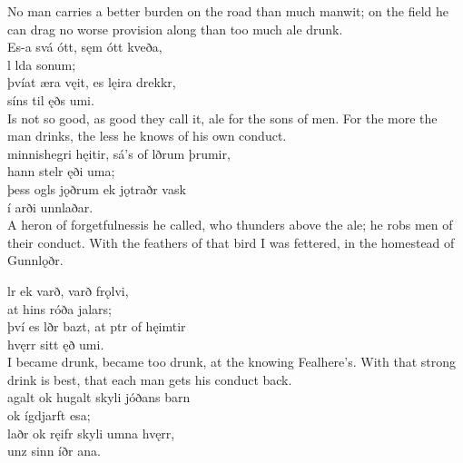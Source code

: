 \bvb No man carries a better burden on the road than much manwit; on the field he can drag no worse provision along than too much ale drunk. \\

\bva Es-a svá ótt, \hld sęm ótt kveða, \\%
\ind {}l lda sonum; \\%
þvíat æra vęit, \hld es lęira drekkr, \\%
\ind síns til ęðs umi.\\%

\bvb Is not so good, as good they call it, ale for the sons of men. For the more the man drinks, the less he knows of his own conduct. \\

\bva {}minnishegri hęitir, \hld sá's of lðrum þrumir, \\%
\ind hann stelr ęði uma; \\%
þess ogls jǫðrum \hld ek jǫtraðr vask \\%
\ind í arði unnlaðar.\\%

\bvb A heron of forgetfulness\footnotemark[13] is he called, who thunders above the ale; he robs men of their conduct. With the feathers of that bird I was fettered, in the homestead of Gunnlǫðr. \\

\bva {}lr ek varð, \hld varð frǫlvi, \\%
\ind at hins róða jalars; \\%
því es lðr bazt, \hld at ptr of hęimtir \\%
\ind hvęrr sitt ęð umi.\\%

\bvb I became drunk, became too drunk, at the knowing Fealhere's. With that strong drink is best, that each man gets his conduct back. \\

\bva {}agalt ok hugalt \hld skyli jóðans barn \\%
\ind ok ígdjarft esa; \\%
laðr ok ręifr \hld skyli umna hvęrr, \\%
\ind unz sinn íðr ana.\\%

